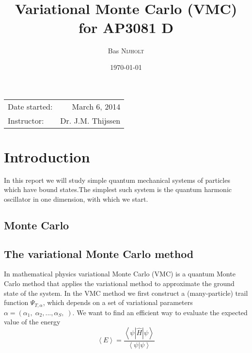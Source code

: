 \documentclass{article}
\title{Variational Monte Carlo (VMC) \\ for AP3081 D} %
\author{Bas \textsc{Nijholt}} %
\date{\today} %
\begin{document}
\maketitle %

\begin{center}
\begin{tabular}{l r}
Date started: & March 6, 2014 \\ 
Instructor: & Dr. J.M. Thijssen
\end{tabular}
\end{center}

\begin{abstract}

\end{abstract}


\section{Introduction}
In this report we will study simple quantum mechanical systems of particles which have bound states.The simplest such system is the quantum harmonic oscillator in one dimension, with which we start. 


\subsection{Monte Carlo}

\subsection{The variational Monte Carlo method}
In mathematical physics variational Monte Carlo (VMC) is a quantum Monte Carlo method that applies the variational method to approximate the ground state of the system. In the VMC method we first construct a (many-particle) trail function $\Psi_{T,\alpha}$, which depends on a set of variational parameters $\alpha = (\alpha_1,\;\alpha_2,...,\alpha_S,\; )$. We want to find an efficient way to evaluate the expected value of the energy
\begin{equation}
\left\langle E \right\rangle = \frac{\left\langle \psi \left| \hat{H} \right|\psi \right\rangle}{\left\langle \psi | \psi \right\rangle}
\end{equation}
\end{document}
